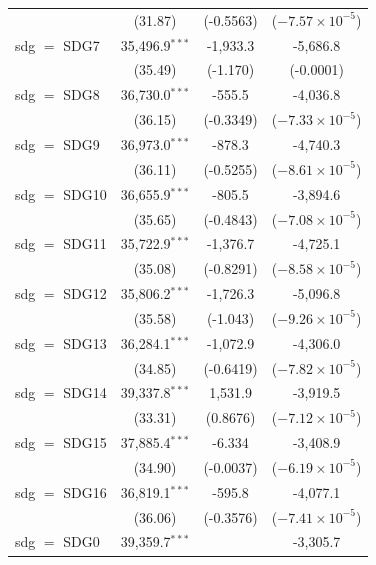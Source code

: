 \begin{tabular}{lccc}
                 & (31.87)           & (-0.5563)         & ($-7.57\times 10^{-5}$)\\    
   sdg $=$ SDG7  & 35,496.9$^{***}$  & -1,933.3          & -5,686.8\\   
                 & (35.49)           & (-1.170)          & (-0.0001)\\   
   sdg $=$ SDG8  & 36,730.0$^{***}$  & -555.5            & -4,036.8\\   
                 & (36.15)           & (-0.3349)         & ($-7.33\times 10^{-5}$)\\    
   sdg $=$ SDG9  & 36,973.0$^{***}$  & -878.3            & -4,740.3\\   
                 & (36.11)           & (-0.5255)         & ($-8.61\times 10^{-5}$)\\    
   sdg $=$ SDG10 & 36,655.9$^{***}$  & -805.5            & -3,894.6\\   
                 & (35.65)           & (-0.4843)         & ($-7.08\times 10^{-5}$)\\    
   sdg $=$ SDG11 & 35,722.9$^{***}$  & -1,376.7          & -4,725.1\\   
                 & (35.08)           & (-0.8291)         & ($-8.58\times 10^{-5}$)\\    
   sdg $=$ SDG12 & 35,806.2$^{***}$  & -1,726.3          & -5,096.8\\   
                 & (35.58)           & (-1.043)          & ($-9.26\times 10^{-5}$)\\    
   sdg $=$ SDG13 & 36,284.1$^{***}$  & -1,072.9          & -4,306.0\\   
                 & (34.85)           & (-0.6419)         & ($-7.82\times 10^{-5}$)\\    
   sdg $=$ SDG14 & 39,337.8$^{***}$  & 1,531.9           & -3,919.5\\   
                 & (33.31)           & (0.8676)          & ($-7.12\times 10^{-5}$)\\    
   sdg $=$ SDG15 & 37,885.4$^{***}$  & -6.334            & -3,408.9\\   
                 & (34.90)           & (-0.0037)         & ($-6.19\times 10^{-5}$)\\    
   sdg $=$ SDG16 & 36,819.1$^{***}$  & -595.8            & -4,077.1\\   
                 & (36.06)           & (-0.3576)         & ($-7.41\times 10^{-5}$)\\    
   sdg $=$ SDG0  & 39,359.7$^{***}$  &                   & -3,305.7\\   

\end{tabular}

